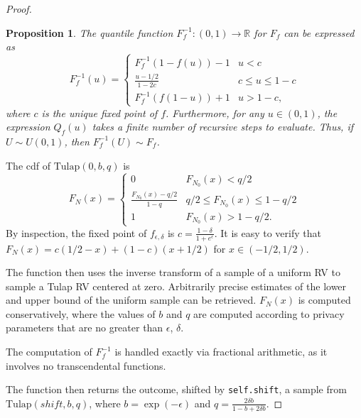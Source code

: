 \documentclass{article}
\newtheorem{prop}{Proposition}
\begin{document}
\begin{proof} 

\begin{prop}\label{prop1}   %
    The quantile function $F_f^{-1}:(0,1)\rightarrow \mathbb{R}$ for $F_f$ can be expressed as
    \[F_f^{-1}(u) = \begin{cases}
    F_f^{-1}(1-f(u))-1&u<c\\
    \frac{u-1/2}{1-2c}&c\leq u\leq 1-c\\
    F_f^{-1}(f(1-u))+1&u>1-c,
    \end{cases}\]
    where $c$ is the unique fixed point of $f$. 
    {Furthermore, for any $u\in (0,1)$, the expression $Q_f(u)$ takes a finite number of recursive steps to evaluate. Thus,} 
    if $U\sim U(0,1)$, then $F_f^{-1}(U) \sim F_f$. 
\end{prop}

The cdf of $\mathrm{Tulap}(0,b,q)$ is
\[F_N(x) = \begin{cases}
    0&F_{N_0}(x)<q/2\\
    \frac{F_{N_0}(x)-q/2}{1-q}& q/2\leq F_{N_0}(x)\leq 1-q/2\\
    1&F_{N_0}(x)>1-q/2.
\end{cases}\]
By inspection, the fixed point of $f_{\epsilon,\delta}$ is $c=\frac{1-\delta}{1+e^\epsilon}$. 
It is easy to verify that $F_N(x) = c(1/2-x) + (1-c)(x+1/2)$ for $x\in (-1/2,1/2)$. 

The function then uses the inverse transform of a sample of a uniform RV to sample a Tulap RV centered at zero.
Arbitrarily precise estimates of the lower and upper bound of the uniform sample can be retrieved.
$F_N(x)$ is computed conservatively, 
where the values of $b$ and $q$ are computed according to privacy parameters that are no greater than $\epsilon$, $\delta$.

The computation of $F_f^{-1}$ is handled exactly via fractional arithmetic, 
as it involves no transcendental functions.

The function then returns the outcome, shifted by \texttt{self.shift}, a sample from $\mathrm{Tulap}(shift,b,q)$,
where $b = \exp(-\epsilon)$ and $q = \frac{2\delta b}{1-b+2\delta b}$.


\end{proof}
\end{document}
